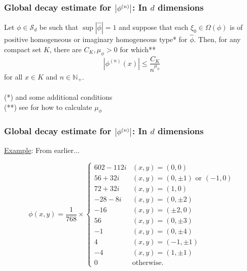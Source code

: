 \documentclass{beamer}
\theoremstyle{definition}
\begin{document}
\begin{frame}
\frametitle{Global decay estimate for $\abs{\phi^{(n)}}$: In $d$ dimensions}




\begin{theorem}\label{thm:ConvolutionPowerEstimate}
	Let $\phi\in\mathcal{S}_d$ be such that $\sup |\widehat{\phi}|=1$ and suppose that each $\xi_0\in\Omega(\phi)$ is of positive homogeneous or imaginary homogeneous type* for $\widehat{\phi}$. Then, for any compact set $K$, there are $C_K, \mu_\phi>0$ for which**
	\begin{equation*}
	\left|\phi^{(n)}(x)\right|\leq\frac{C_K}{n^{\mu_\phi}}
	\end{equation*}
	for all $x\in K$ and $n\in\mathbb{N}_+$.\\
	$\,$\\
	
	\scriptsize{(*) and some additional conditions}\\
	\scriptsize{(**) see \cite{bui2021generalized} for how to calculate $\mu_\phi$}
\end{theorem}


\end{frame}









\begin{frame}
\frametitle{Global decay estimate for $\abs{\phi^{(n)}}$: In $d$ dimensions}

\underline{Example}: From earlier...

\begin{equation*}
\phi(x,y) = 
\frac{1}{768}\times
\begin{cases}
602 - 112i &(x,y) = (0,0)\\
56 + 32i   &(x,y) = (0,\pm 1)\mbox{ or }(-1,0)\\
72 + 32i   &(x,y) = (1,0)\\
-28 - 8i   &(x,y) = (0,\pm 2)\\
-16        &(x,y) = (\pm 2,0)\\
56         &(x,y) = (0,\pm 3)\\
-1         &(x,y) = (0,\pm 4)\\
4          &(x,y) = (-1,\pm 1)\\
-4         &(x,y) = (1,\pm 1)\\
0          &\text{otherwise}.
\end{cases}
\end{equation*}

\end{frame}
\end{document}
